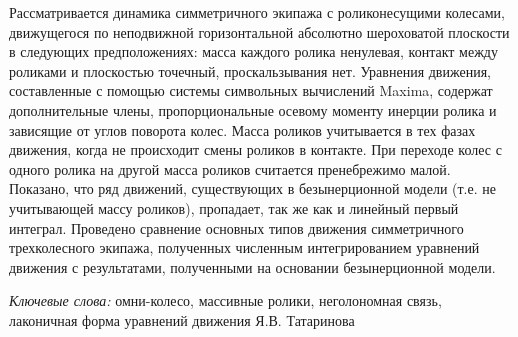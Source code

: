 \begin{adjustwidth}{1cm}{1cm}
\hspace{1cm} Рассматривается динамика симметричного экипажа с роликонесущими колесами, движущегося по  неподвижной горизонтальной абсолютно шероховатой плоскости в следующих предположениях: масса каждого ролика ненулевая, контакт между роликами и плоскостью точечный, проскальзывания нет. Уравнения движения, составленные с помощью системы символьных вычислений Maxima, содержат дополнительные члены, пропорциональные осевому моменту инерции ролика и зависящие от углов поворота колес. Масса роликов учитывается в тех фазах движения, когда не происходит смены роликов в контакте. При переходе колес с одного ролика на другой масса роликов считается пренебрежимо малой. Показано, что ряд движений, существующих в безынерционной модели (т.е. не учитывающей массу роликов), пропадает, так же как и линейный первый интеграл. Проведено сравнение основных типов движения симметричного трехколесного экипажа, полученных численным интегрированием уравнений движения с результатами, полученными на основании безынерционной модели.
\end{adjustwidth} 
\textit{Ключевые слова:} омни-колесо, массивные ролики, неголономная связь, лаконичная форма уравнений движения Я.В. Татаринова
\vspace{1.5cm}
